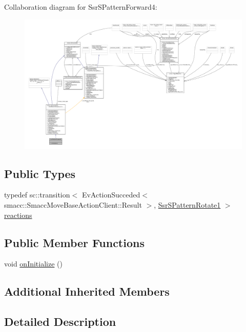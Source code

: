 Collaboration diagram for Ssr\+S\+Pattern\+Forward4\+:
\nopagebreak
\begin{figure}[H]
\begin{center}
\leavevmode
\includegraphics[width=350pt]{structSsrSPatternForward4__coll__graph}
\end{center}
\end{figure}
\subsection*{Public Types}
\begin{DoxyCompactItemize}
\item 
typedef sc\+::transition$<$ Ev\+Action\+Succeded$<$ smacc\+::\+Smacc\+Move\+Base\+Action\+Client\+::\+Result $>$, \hyperlink{structSsrSPatternRotate1}{Ssr\+S\+Pattern\+Rotate1} $>$ \hyperlink{structSsrSPatternForward4_aa68aaf2c5e802fffed3b924ebb92ac78}{reactions}
\end{DoxyCompactItemize}
\subsection*{Public Member Functions}
\begin{DoxyCompactItemize}
\item 
void \hyperlink{structSsrSPatternForward4_ad0ad8bfc383496145a5e535031286f73}{on\+Initialize} ()
\end{DoxyCompactItemize}
\subsection*{Additional Inherited Members}


\subsection{Detailed Description}


